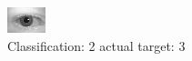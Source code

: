 \begin{figure}[h!]
\begin{center}
\includegraphics[width=0.60\columnwidth]{figures/ID585_class_2_target_3.png}
\end{center}
\caption{ Classification: 2 actual target: 3}
\label{fig:ID585_class_2_target_3}
\end{figure}
